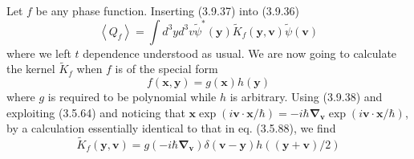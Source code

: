\documentclass{article}
\begin{document}
Let $f$ be any phase function. Inserting (3.9.37) into (3.9.36)
$$
\begin{equation*}
\left\langle Q_{f}\right\rangle=\int d^{3} y d^{3} v \tilde{\psi}^{*}(\boldsymbol{y}) \tilde{K}_{f}(\boldsymbol{y}, \boldsymbol{v}) \tilde{\psi}(\boldsymbol{v}) \tag{3.9.43}
\end{equation*}
$$
where we left $t$ dependence understood as usual. We are now going to calculate the kernel $\tilde{K}_{f}$ when $f$ is of the special form
$$
\begin{equation*}
f(\boldsymbol{x}, \boldsymbol{y})=g(\boldsymbol{x}) h(\boldsymbol{y}) \tag{3.9.44}
\end{equation*}
$$
where $g$ is required to be polynomial while $h$ is arbitrary. Using (3.9.38) and exploiting (3.5.64) and noticing that $\boldsymbol{x} \exp (i \boldsymbol{v} \cdot \boldsymbol{x} / \hbar)=-i \hbar \boldsymbol{\nabla}_{\boldsymbol{v}} \exp (i \boldsymbol{v} \cdot \boldsymbol{x} / \hbar)$, by a calculation essentially identical to that in eq. (3.5.88), we find
$$
\begin{equation*}
\tilde{K}_{f}(\boldsymbol{y}, \boldsymbol{v})=g\left(-i \hbar \boldsymbol{\nabla}_{\boldsymbol{v}}\right) \delta(\boldsymbol{v}-\boldsymbol{y}) h((\boldsymbol{y}+\boldsymbol{v}) / 2) \tag{3.9.45}
\end{equation*}
$$
\end{document}
